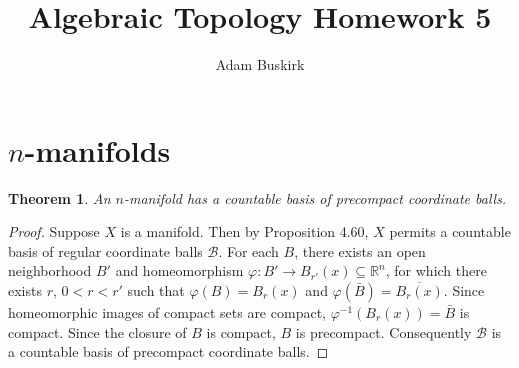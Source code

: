\documentclass{article}
\title{Algebraic Topology Homework 5}
\author{Adam Buskirk}
\newtheorem{theorem}[subsection]{Theorem}
\newtheorem{lemma}[subsection]{Lemma}
\theoremstyle{definition}
\newcommand{\R}{\mathbb{R}}
\newcommand{\set}[1]{\left\{#1\right\}}
\begin{document}
\maketitle

\section{$n$-manifolds}

\begin{theorem}
An $n$-manifold has a countable basis of precompact coordinate balls.
\end{theorem}
\begin{proof}
Suppose $X$ is a manifold. Then by Proposition 4.60,
$X$ permits a countable basis of regular coordinate balls $\mathcal{B}$. 
For each $B$, there exists an open neighborhood $B'$ and homeomorphism 
$\varphi : B' \to B_{r'}(x) \subseteq \R^n$, for which there exists
$r$, $0 < r < r'$ such that $\varphi(B) = B_r(x)$ and 
$\varphi(\bar{B}) = \overline{B_r(x)}$. Since homeomorphic images of
compact sets are compact, $\varphi^{-1}(B_r(x))=\bar{B}$ is compact. 
Since the closure
of $B$ is compact, $B$ is precompact. Consequently $\mathcal{B}$ is
a countable basis of precompact coordinate balls.
\end{proof}
\end{document}

